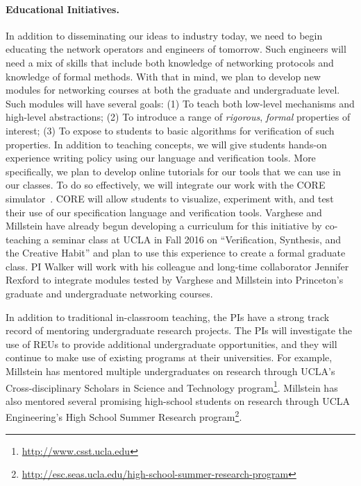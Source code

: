 \paragraph*{Educational Initiatives.}
In addition to disseminating our ideas to industry today,
we need to begin educating the network operators and engineers 
of tomorrow.  Such engineers will need a mix of skills that include
both knowledge of networking protocols and knowledge of formal methods.
With that in mind, we plan to develop new modules for networking courses
at both the graduate and undergraduate level.  
Such modules will have
several goals: (1) To teach both low-level mechanisms and high-level abstractions;
(2) To introduce a range of \emph{rigorous}, \emph{formal} properties of
 interest; (3) To expose to students to basic algorithms for verification of such
properties.
In addition to teaching concepts, we will give students hands-on
experience writing policy using our language and verification tools.  
More specifically, we plan to develop online tutorials for our tools
that we can use in our classes.  To do so effectively, we will
integrate our work with the CORE simulator~\cite{core}.  CORE
will allow students to visualize, experiment with, and test their
use of our specification language and verification tools.
Varghese and Millstein have already begun developing a curriculum for this initiative
by co-teaching a seminar class at UCLA in Fall 2016 on ``Verification, Synthesis, and the Creative Habit'' 
and plan to use this experience to create a formal graduate class.  PI Walker will work with
his colleague and long-time collaborator Jennifer Rexford to integrate modules tested by Varghese and Millstein into Princeton's
graduate and undergraduate networking courses.

In addition to traditional in-classroom teaching, the PIs have a strong 
track record of mentoring
undergraduate research projects.
The PIs will
investigate the use of REUs to provide additional undergraduate opportunities, and they will continue to make use of existing programs at their universities. For example, Millstein has mentored multiple undergraduates on research through UCLA's Cross-disciplinary Scholars in Science and Technology program\footnote{\url{http://www.csst.ucla.edu}}.
Millstein has also mentored several promising high-school students on research through UCLA Engineering's High School Summer Research program\footnote{\url{http://esc.seas.ucla.edu/high-school-summer-research-program}}.

